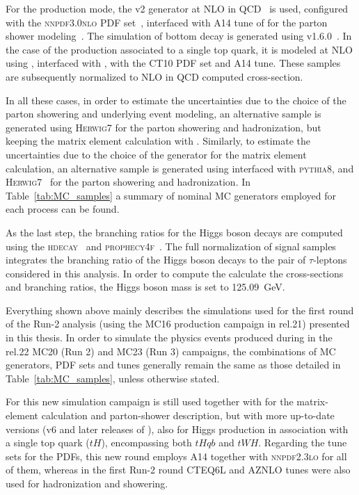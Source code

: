 For the \tth production mode, the \powhegbox v2 generator at NLO in QCD~\cite{frixione2015,Zhang_2014,Dawson_2003,Beenakker_2003} is used, configured with the \textsc{nnpdf3.0nlo} PDF set~\cite{Martin_2009}, interfaced with A14 tune of  for the parton shower modeling~\cite{A14}. The simulation of bottom decay is generated using \evtgen v1.6.0~\cite{LANGE2001152}.
In the case of the production associated to a single top quark, it is modeled at NLO using \madgraph, interfaced with , with the \textsc{CT10} PDF set and A14 tune. These samples are subsequently normalized to NLO in QCD computed cross-section.

In all these cases, in order to estimate the uncertainties due to the choice of the parton showering and underlying event modeling, an alternative sample is generated using \textsc{Herwig7} for the parton showering and hadronization, 
but keeping the matrix element calculation with \powheg. Similarly, to estimate the uncertainties due to the choice of the generator for the matrix element calculation,
an alternative sample is generated using \madgraph interfaced with \textsc{pythia8}, and \textsc{Herwig7}~\cite{bellm2017herwig71releasenote} for the parton showering and hadronization.
In Table~\ref{tab:MC_samples} a summary of nominal MC generators employed for each process can be found.

As the last step, the branching ratios for the Higgs boson decays are computed using the \textsc{hdecay}~\cite{Djouadi:1997yw,Spira:1997dg,Djouadi:2006bz} and \textsc{prophecy4f}~\cite{Bredenstein:2006ha,Bredenstein:2006rh,Bredenstein:2006nk}.
The full normalization of signal samples integrates the branching ratio of the Higgs boson decays to the pair of $\tau$-leptons considered in this analysis. In order to compute the calculate the cross-sections and branching ratios, the Higgs boson mass is set to 125.09~GeV.

Everything shown above mainly describes the simulations used for the first round of the Run-2 analysis (using the MC16 production campaign in rel.21) presented in this thesis. In order to simulate the physics events produced during in the rel.22 MC20 (Run 2) and MC23 (Run 3) campaigns,
the combinations of MC generators, PDF sets and tunes generally remain the same as those detailed in Table~\ref{tab:MC_samples}, unless otherwise stated.

For this new simulation campaign \powheg is still used together with \pythia for the matrix-element calculation and parton-shower description, but with more up-to-date versions (v6 and later releases of ), also for Higgs production in association with a single top quark ($tH$), encompassing both $tHqb$ and $tWH$.
Regarding the tune sets for the PDFs, this new round employs A14 together with \textsc{nnpdf2.3lo} for all of them, whereas in the first Run-2 round \textsc{CTEQ6L} and \textsc{AZNLO} tunes were also used for hadronization and showering.

